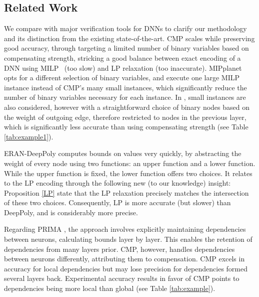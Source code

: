 \subsection{Related Work} 

We compare {\CMP} with major verification tools for DNNs to clarify our methodology and its distinction from the existing state-of-the-art. CMP scales while preserving good accuracy, through targeting a limited number of binary variables based on compensating strength, stricking a good balance between exact encoding of a DNN using MILP~\cite{MILP} (too slow) and LP relaxation (too inaccurate). MIPplanet~\cite{MIPplanet} opts for a different selection of binary variables, and execute one large MILP instance instead of CMP's many small instances, which significantly reduce the number of binary variables necessary for each instance. In \cite{9211410}, small instances are also considered, however with a straightforward choice of binary nodes based on the weight of outgoing edge, therefore restricted to nodes in the previous layer, which is significantly less accurate than using compensating strength (see Table \ref{tab:example1}).

ERAN-DeepPoly \cite{deeppoly} computes bounds on values very quickly, by abstracting the weight of every node using two functions: an upper function and a lower function. While the upper function is fixed, the lower function offers two choices.
It relates to the LP encoding through the following new (to our knowledge) insight:  Proposition \ref{LP} state that the LP relaxation precisely matches the intersection of these two choices. Consequently, LP is more accurate (but slower) than DeepPoly, and \CMP is considerably more precise.

Regarding PRIMA \cite{prima}, the approach involves explicitly maintaining dependencies between neurons, calculating bounds layer by layer. This enables the retention of dependencies from many layers prior. CMP, however, handles dependencies between neurons differently, attributing them to compensation. CMP excels in accuracy for local dependencies but may lose precision for dependencies formed several layers back. 
Experimental accuracy results in favor of CMP points to dependencies being more local than global (see Table \ref{tab:example}).


